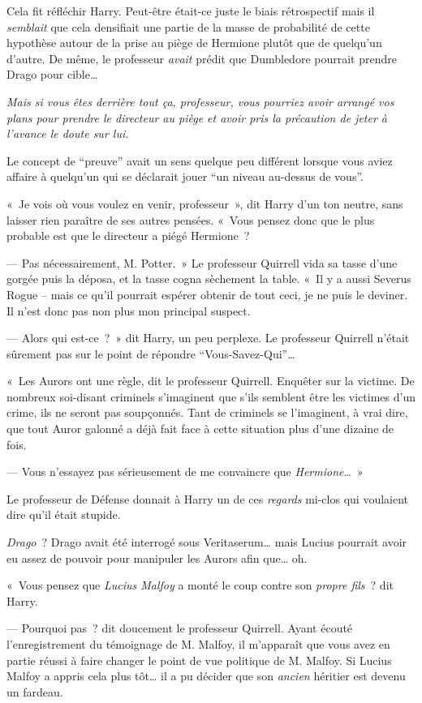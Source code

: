 Cela fit réfléchir Harry.
Peut-être était-ce juste le biais rétrospectif mais il \emph{semblait} que cela densifiait une partie de la masse de probabilité de cette hypothèse autour de la prise au piège de Hermione plutôt que de quelqu'un d'autre.
De même, le professeur \emph{avait} prédit que Dumbledore pourrait prendre Drago pour cible…

\emph{Mais si vous êtes derrière tout ça, professeur, vous pourriez avoir arrangé vos plans pour prendre le directeur au piège et avoir pris la précaution de jeter à l'avance le doute sur lui.}

Le concept de “preuve” avait un sens quelque peu différent lorsque vous aviez affaire à quelqu'un qui se déclarait jouer “un niveau au-dessus de vous”.

«~Je vois où vous voulez en venir, professeur~», dit Harry d'un ton neutre, sans laisser rien paraître de ses autres pensées.
«~Vous pensez donc que le plus probable est que le directeur a piégé Hermione~?

--- Pas nécessairement, M. Potter.~»
Le professeur Quirrell vida sa tasse d'une gorgée puis la déposa, et la tasse cogna sèchement la table.
«~Il y a aussi Severus Rogue -- mais ce qu'il pourrait espérer obtenir de tout ceci, je ne puis le deviner.
Il n'est donc pas non plus mon principal suspect.

--- Alors qui est-ce~?~»
dit Harry, un peu perplexe.
Le professeur Quirrell n'était sûrement pas sur le point de répondre “Vous-Savez-Qui”…

«~Les Aurors ont une règle, dit le professeur Quirrell.
Enquêter sur la victime.
De nombreux soi-disant criminels s'imaginent que s'ils semblent être les victimes d'un crime, ils ne seront pas soupçonnés.
Tant de criminels se l'imaginent, à vrai dire, que tout Auror galonné a déjà fait face à cette situation plus d'une dizaine de fois.

--- Vous n'essayez pas sérieusement de me convaincre que \emph{Hermione}…~»

Le professeur de Défense donnait à Harry un de ces \emph{regards} mi-clos qui voulaient dire qu'il était stupide.

\emph{Drago}~?
Drago avait été interrogé sous Veritaserum… mais Lucius pourrait avoir eu assez de pouvoir pour manipuler les Aurors afin que… oh.

«~Vous pensez que \emph{Lucius Malfoy} a monté le coup contre son \emph{propre fils}~? dit Harry.

--- Pourquoi pas~? dit doucement le professeur Quirrell.
Ayant écouté l'enregistrement du témoignage de M. Malfoy, il m'apparaît que vous avez en partie réussi à faire changer le point de vue politique de M. Malfoy.
Si Lucius Malfoy a appris cela plus tôt… il a pu décider que son \emph{ancien} héritier est devenu un fardeau.

